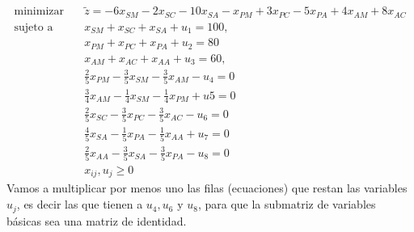 \documentclass[12pt]{article}
\begin{document}
\[
\begin{aligned}
\text{minimizar} \quad &  \widetilde{ z }  = -6x_{SM} - 2x_{SC} - 10x_{SA} - x_{PM} + 3x_{PC} -
5x_{PA} + 4x_{AM} + 8x_{AC}\\
\text{sujeto a} \quad
& x_{SM} + x_{SC} + x_{SA} + u_1 = 100, \\
& x_{PM} + x_{PC} + x_{PA} + u_2 = 80 \\
& x_{AM} + x_{AC} + x_{AA} + u_3 = 60, \\
& \frac{2}{5}x_{PM} - \frac{3}{5} x_{SM} - \frac{3}{5}x_{AM} - u_4 = 0\\ 
& \frac{3}{4} x_{AM} - \frac{1}{4} x_{SM} - \frac{1}{4} x_{PM} + u 5 = 0 \\ 
& \frac{2}{5} x_{SC} - \frac{3}{5}x_{PC} - \frac{3}{5} x_{AC} -u_6 = 0 \\ 
&\frac{4}{5} x_{SA} - \frac{1}{5} x_{PA} -\frac{1}{5}x_{AA}+ u_7 = 0 \\ 
&\frac{2}{5} x_{AA} - \frac{3}{5} x_{SA} - \frac{3}{5} x_{PA} - u_8 = 0\\ 
&x_{ij}, u_j \geq 0
\end{aligned}
\]
Vamos a multiplicar por menos uno las filas (ecuaciones) que restan las
variables $u_j$, es decir las que tienen a $u_4, u_6$ y $u_8$, para que la
submatriz de variables básicas sea una matriz de identidad.
\end{document}
